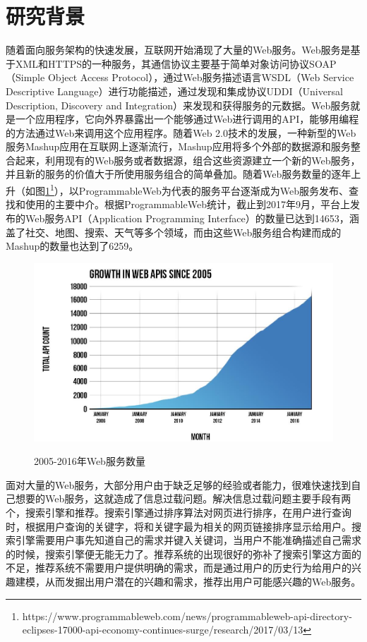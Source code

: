 \documentclass[master,winfonts]{njuthesis}
\begin{document}
\section{研究背景}
随着面向服务架构的快速发展，互联网开始涌现了大量的Web服务。Web服务是基于XML和HTTPS的一种服务，其通信协议主要基于简单对象访问协议SOAP（Simple Object Access Protocol），通过Web服务描述语言WSDL（Web Service Descriptive Language）进行功能描述，通过发现和集成协议UDDI（Universal Description, Discovery and Integration）来发现和获得服务的元数据。Web服务就是一个应用程序，它向外界暴露出一个能够通过Web进行调用的API，能够用编程的方法通过Web来调用这个应用程序。随着Web 2.0技术的发展，一种新型的Web服务Mashup应用在互联网上逐渐流行，Mashup应用将多个外部的数据源和服务整合起来，利用现有的Web服务或者数据源，组合这些资源建立一个新的Web服务，并且新的服务的价值大于所使用服务组合的简单叠加。随着Web服务数量的逐年上升（如图\ref{fig:1}\protect\footnote{https://www.programmableweb.com/news/programmableweb-api-directory-eclipses-17000-api-economy-continues-surge/research/2017/03/13}），以ProgrammableWeb为代表的服务平台逐渐成为Web服务发布、查找和使用的主要中介。根据ProgrammableWeb统计，截止到2017年9月，平台上发布的Web服务API（Application Programming Interface）的数量已达到14653，涵盖了社交、地图、搜索、天气等多个领域，而由这些Web服务组合构建而成的Mashup的数量也达到了6259。
\begin{figure}[htbp]
  \centering
  \includegraphics[width=\textwidth]{Picture1-1.jpg}\\
  \caption{2005-2016年Web服务数量}\label{fig:1}
\end{figure}
面对大量的Web服务，大部分用户由于缺乏足够的经验或者能力，很难快速找到自己想要的Web服务，这就造成了信息过载\cite{Borchers1998Ganging}问题。解决信息过载问题主要手段有两个，搜索引擎和推荐\cite{Jannach2010Recommender}。搜索引擎通过排序算法对网页进行排序，在用户进行查询时，根据用户查询的关键字，将和关键字最为相关的网页链接排序显示给用户。搜索引擎需要用户事先知道自己的需求并键入关键词，当用户不能准确描述自己需求的时候，搜索引擎便无能无力了。推荐系统的出现很好的弥补了搜索引擎这方面的不足，推荐系统不需要用户提供明确的需求，而是通过用户的历史行为给用户的兴趣建模，从而发掘出用户潜在的兴趣和需求，推荐出用户可能感兴趣的Web服务。
\end{document}
